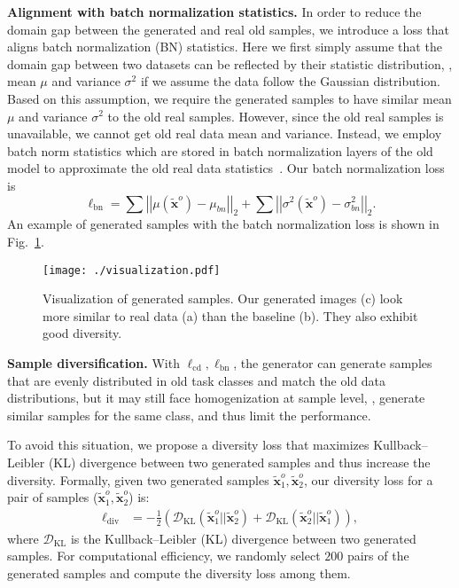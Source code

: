 \documentclass[10pt,twocolumn,letterpaper]{article}
\begin{document}
\textbf{Alignment with batch normalization statistics.}
In order to reduce the domain gap between the generated and real old samples, we introduce a loss that aligns batch normalization (BN) statistics.
Here we first simply assume that the domain gap between two datasets can be reflected by their statistic distribution, \ie, mean $\mu$ and variance $\sigma^2$ if we assume the data follow the Gaussian distribution. Based on this assumption, we require the generated samples to have similar mean $\mu$ and variance $\sigma^2$ to the old real samples. However, since the old real samples is unavailable, we cannot get old real data mean and variance. Instead,
we employ batch norm statistics which are stored in batch normalization layers of the old model to approximate the old real data statistics~\cite{yin2020dreaming}. Our batch normalization loss is
\begin{equation}
    \ell_\text{bn} = \sum\left|\left|\mu(\tilde{\mathbf{x}}^o) - \mu_{bn}\right|\right|_2 + \sum\left|\left|\sigma^2(\tilde{\mathbf{x}}^o) - \sigma^2_{bn} \right|\right|_2.
\end{equation}
An example of generated samples with the batch normalization loss is shown in Fig.~\ref{G_visualization}.
\begin{figure}[t]
\begin{center}
 \texttt{[image: ./visualization.pdf]}
 \end{center}
\caption{\small{Visualization of generated samples. Our generated images (c) look more similar to real data (a) than the baseline (b). They also exhibit good diversity.}}
 \vspace{-6mm}
\label{G_visualization}
\end{figure}

\textbf{Sample diversification.}
With $\ell_\text{cd}, \ell_\text{bn}$, the generator can generate samples that are evenly distributed in old task classes and match the old data distributions, but it may still face homogenization at sample level, \ie, generate similar samples for the same class, and thus limit the performance. 

To avoid this situation, we propose a diversity loss that maximizes Kullback–Leibler (KL) divergence between two generated samples and thus increase the diversity. Formally, given two generated samples $\tilde{\mathbf{x}}_1^o, \tilde{\mathbf{x}}^o_2$, our diversity loss for a pair of samples ($\tilde{\mathbf{x}}_1^o, \tilde{\mathbf{x}}^o_2$) is:
\begin{align}
    \ell_\text{div} &= - \frac{1}{2}(\mathcal{D}_{\text{KL}}(\tilde{\mathbf{x}}_1^o||\tilde{\mathbf{x}}_2^o) + \mathcal{D}_{\text{KL}}(\tilde{\mathbf{x}}_2^o||\tilde{\mathbf{x}}_1^o)),
\end{align}
where $\mathcal{D}_{\text{KL}}$ is the Kullback–Leibler (KL) divergence between two generated samples. For computational efficiency, we randomly select $200$ pairs of the generated samples and compute the diversity loss among them.
\end{document}
